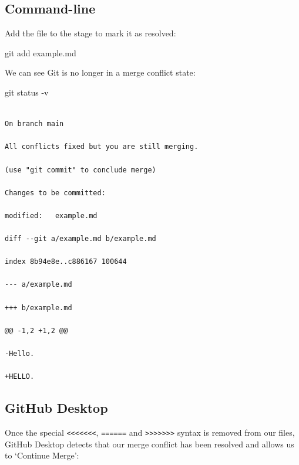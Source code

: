 \documentclass[
  letterpaper,
  DIV=11,
  numbers=noendperiod]{scrartcl}
\newenvironment{Shaded}{\begin{snugshade}}{\end{snugshade}}
\newcommand{\NormalTok}[1]{\textcolor[rgb]{0.00,0.23,0.31}{#1}}
\newcommand{\SpecialCharTok}[1]{\textcolor[rgb]{0.37,0.37,0.37}{#1}}
\begin{document}
\subsection{Command-line}

Add the file to the stage to mark it as resolved:

\begin{Shaded}
\begin{Highlighting}[]
\NormalTok{git add example.md}
\end{Highlighting}
\end{Shaded}

We can see Git is no longer in a merge conflict state:

\begin{Shaded}
\begin{Highlighting}[]
\NormalTok{git status }\SpecialCharTok{{-}}\NormalTok{v}
\end{Highlighting}
\end{Shaded}

\begin{verbatim}

On branch main

All conflicts fixed but you are still merging.

(use "git commit" to conclude merge)

Changes to be committed:

modified:   example.md

diff --git a/example.md b/example.md

index 8b94e8e..c886167 100644

--- a/example.md

+++ b/example.md

@@ -1,2 +1,2 @@

-Hello.

+HELLO.
\end{verbatim}

\subsection{GitHub Desktop}

Once the special
\texttt{\textless{}\textless{}\textless{}\textless{}\textless{}\textless{}\textless{}},
\texttt{======} and
\texttt{\textgreater{}\textgreater{}\textgreater{}\textgreater{}\textgreater{}\textgreater{}\textgreater{}}
syntax is removed from our files, GitHub Desktop detects that our merge
conflict has been resolved and allows us to `Continue Merge':
\end{document}
